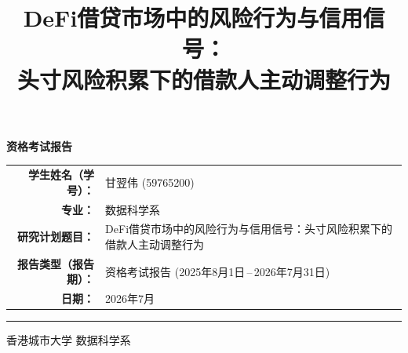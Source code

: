 \documentclass[12pt,a4paper,fontset=mac]{ctexart}
\title{\vspace{-1.5cm} \textbf{DeFi借贷市场中的风险行为与信用信号：}\\\large{头寸风险积累下的借款人主动调整行为}}
\author{}
\date{}
\begin{document}
\thispagestyle{empty}
\begin{center}

\vspace*{2cm}

{\large\textbf{资格考试报告}}

\vspace{2.5cm}

\begin{tabular}{r@{\hskip 6pt}l}
\textbf{学生姓名（学号）：} & 甘翌伟 (59765200) \\[8pt]
\textbf{专业：} & 数据科学系 \\[8pt]
\textbf{研究计划题目：} & \parbox[t]{9cm}{\raggedright\small DeFi借贷市场中的风险行为与信用信号：头寸风险积累下的借款人主动调整行为} \\[8pt]
\textbf{报告类型（报告期）：} & 资格考试报告 (2025年8月1日\,--\,2026年7月31日) \\[8pt]
\textbf{日期：} & 2026年7月
\end{tabular}

\vfill
\rule{\textwidth}{0.5pt}
\footnotesize 香港城市大学 \hspace{1cm} 数据科学系

\end{center}

\newpage

\maketitle
\thispagestyle{empty}


\newpage
\tableofcontents
\newpage


\newpage

\newpage


\newpage

\newpage

\newpage


\end{document}
